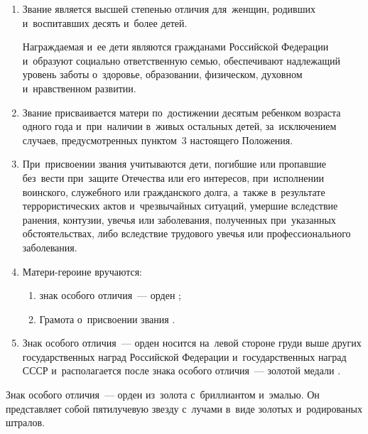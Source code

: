 \documentclass{../president-decree}
\providecommand*{\asbuk}{}
\begin{document}
	\begin{enumerate}
		\sloppy \item Звание  является высшей степенью отличия для~женщин, родивших и~воспитавших десять и~более детей.
		
		Награждаемая и~ее дети являются гражданами Российской Федерации и~образуют социально ответственную семью, обеспечивают надлежащий уровень заботы о~здоровье, образовании, физическом, духовном и~нравственном развитии.
		
		\item Звание  присваивается матери по~достижении десятым ребенком возраста одного года и~при~наличии в~живых остальных детей, за~исключением случаев, предусмотренных пунктом~3 настоящего Положения.
		
		\item При~присвоении звания  учитываются дети, погибшие или пропавшие без~вести при~защите Отечества или его интересов, при~исполнении воинского, служебного или гражданского долга, а~также в~результате террористических актов и~чрезвычайных ситуаций, умершие вследствие ранения, контузии, увечья или заболевания, полученных при~указанных обстоятельствах, либо вследствие трудового увечья или профессионального заболевания.
		
		\item Матери-героине вручаются:
		\begin{enumerate}[label=\asbuk*), ref=\asbuk*]
			\item знак особого отличия~--- орден ;
			
			\item Грамота о~присвоении звания .
		\end{enumerate}
	
		\item Знак особого отличия~--- орден  носится на~левой стороне груди выше других государственных наград Российской Федерации и~государственных наград СССР и~располагается после знака особого отличия~--- золотой медали .
	\end{enumerate}
\eaddition

	
	Знак особого отличия~--- орден  из~золота с~бриллиантом и~эмалью. Он представляет собой пятилучевую звезду с~лучами в~виде золотых и~родированых штралов.
	
\end{document}

